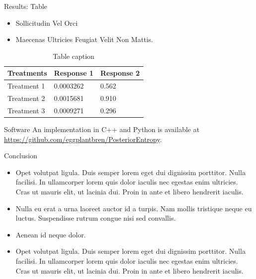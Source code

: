 \documentclass[final,hyperref={pdfpagelabels=false}]{beamer}
\begin{document}
\begin{frame}[t]
\begin{columns}[t]
\begin{column}{.465\textwidth}
\begin{block}{Results: Table}
\begin{itemize}
\item Sollicitudin Vel Orci
\item Maecenas Ultricies Feugiat Velit Non Mattis.
\end{itemize}

\begin{table}
\begin{tabular}{l l l}
\toprule
\textbf{Treatments} & \textbf{Response 1} & \textbf{Response 2}\\
\midrule
Treatment 1 & 0.0003262 & 0.562 \\
Treatment 2 & 0.0015681 & 0.910 \\
Treatment 3 & 0.0009271 & 0.296 \\
\bottomrule
\end{tabular}
\caption{Table caption}
\end{table}
     
\end{block}


\begin{block}{Software}
An implementation in C++ and Python is available at
\href{https://github.com/eggplantbren/PosteriorEntropy}{https://github.com/eggplantbren/PosteriorEntropy}.

\end{block}


\begin{block}{Conclusion}

\begin{itemize}
\item Opet volutpat ligula. Duis semper lorem eget dui dignissim porttitor. Nulla facilisi. In ullamcorper lorem quis dolor iaculis nec egestas enim ultricies. Cras ut mauris elit, ut lacinia dui. Proin in ante et libero hendrerit iaculis.
\item Nulla eu erat a urna laoreet auctor id a turpis. Nam mollis tristique neque eu luctus. Suspendisse rutrum congue nisi sed convallis. 
\item Aenean id neque dolor.
\item Opet volutpat ligula. Duis semper lorem eget dui dignissim porttitor. Nulla facilisi. In ullamcorper lorem quis dolor iaculis nec egestas enim ultricies. Cras ut mauris elit, ut lacinia dui. Proin in ante et libero hendrerit iaculis.
\end{itemize}


\end{block}
\end{column}
\end{columns}
\end{frame}
\end{document}
